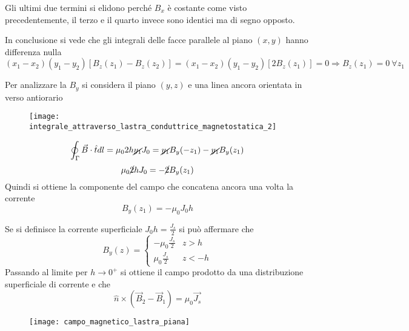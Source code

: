 Gli ultimi due termini si elidono perché $B_x$ è costante come visto precedentemente,
il terzo e il quarto invece sono identici ma di segno opposto.

In conclusione si vede che gli integrali delle facce parallele al piano $(x,y)$ hanno
differenza nulla
$$
(x_1-x_2)(y_1-y_2)[B_z(z_1)-B_z(z_2)] = (x_1-x_2)(y_1-y_2)[2B_z(z_1)] = 0 \Rightarrow B_z(z_1) = 0\ \forall z_1
$$

Per analizzare la $B_y$ si considera il piano $(y,z)$ e una linea ancora orientata in verso 
antiorario
\begin{figure}[H]
\centering
\texttt{[image: integrale\_attraverso\_lastra\_conduttrice\_magnetostatica\_2]}
\end{figure}
$$
\oint_\Gamma\vec{B}\cdot\hat{t}dl =\mu_0 2h\cancel{y_1}J_0 = \cancel{y_1}B_y(-z_1) - \cancel{y_1}B_y(z_1)
$$
$$
\mu_0 \cancel{2} h J_0 = -\cancel{2}B_y(z_1)
$$
Quindi si ottiene la componente del campo che concatena ancora una volta la corrente
$$
B_y(z_1) = -\mu_0 J_0 h
$$

Se si definisce la corrente superficiale $J_0 h = \frac{J_s}{2}$ si può affermare che
$$
B_y(z) = \begin{cases}
-\mu_0\frac{J_s}{2} & z > h\\
\mu_0\frac{J_s}{2} & z < -h
\end{cases}
$$
Passando al limite per $h \to 0^+$ si ottiene il campo prodotto da una distribuzione
superficiale di corrente e che 
$$
\hat{n}\times(\vec{B}_2-\vec{B}_1) = \mu_0 \vec{J_s}
$$
\begin{figure}[H]
\centering
\texttt{[image: campo\_magnetico\_lastra\_piana]}
\end{figure}
